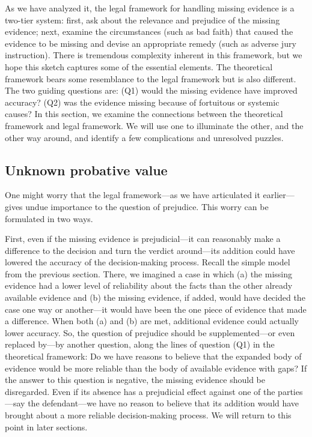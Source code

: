 \documentclass[
  10pt,
  dvipsnames,enabledeprecatedfontcommands]{scrartcl}
\begin{document}
As we have analyzed it, the legal framework for handling missing
evidence is a two-tier system: first, ask about the relevance and
prejudice of the missing evidence; next, examine the circumstances (such
as bad faith) that caused the evidence to be missing and devise an
appropriate remedy (such as adverse jury instruction). There is
tremendous complexity inherent in this framework, but we hope this
sketch captures some of the essential elements. The theoretical
framework bears some resemblance to the legal framework but is also
different. The two guiding questions are: (Q1) would the missing
evidence have improved accuracy? (Q2) was the evidence missing because
of fortuitous or systemic causes? In this section, we examine the
connections between the theoretical framework and legal framework. We
will use one to illuminate the other, and the other way around, and
identify a few complications and unresolved puzzles.

\hypertarget{unknown-probative-value}{%
\subsection{Unknown probative value}\label{unknown-probative-value}}

One might worry that the legal framework---as we have articulated it
earlier---gives undue importance to the question of prejudice. This
worry can be formulated in two ways.

First, even if the missing evidence is prejudicial---it can reasonably
make a difference to the decision and turn the verdict around---its
addition could have lowered the accuracy of the decision-making process.
Recall the simple model from the previous section. There, we imagined a
case in which (a) the missing evidence had a lower level of reliability
about the facts than the other already available evidence and (b) the
missing evidence, if added, would have decided the case one way or
another---it would have been the one piece of evidence that made a
difference. When both (a) and (b) are met, additional evidence could
actually lower accuracy. So, the question of prejudice should be
supplemented---or even replaced by---by another question, along the
lines of question (Q1) in the theoretical framework: Do we have reasons
to believe that the expanded body of evidence would be more reliable
than the body of available evidence with gaps? If the answer to this
question is negative, the missing evidence should be disregarded. Even
if its absence has a prejudicial effect against one of the parties---say
the defendant---we have no reason to believe that its addition would
have brought about a more reliable decision-making process. We will
return to this point in later sections.
\end{document}
